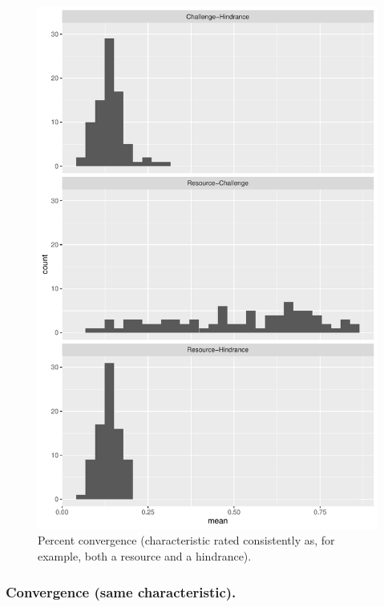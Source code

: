 \documentclass[
  man]{apa6}
\begin{document}
\begin{figure}
\centering
\includegraphics{copy-of-SIOP2023convergence_files/figure-latex/percagree-1.pdf}
\caption{\label{fig:percagree}Percent convergence (characteristic rated consistently as, for example, both a resource and a hindrance).}
\end{figure}

\hypertarget{convergence-same-characteristic.}{%
\subsubsection{Convergence (same characteristic).}\label{convergence-same-characteristic.}}
\end{document}

